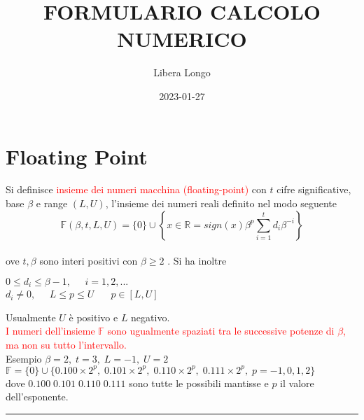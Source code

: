 \documentclass{article}
\title{FORMULARIO CALCOLO NUMERICO}
\date{2023-01-27}
\author{Libera Longo}
\newcommand\separationline{\noindent\rule{\textwidth}{0.4pt}} %
\begin{document}
	\maketitle
	\section{Floating Point}

		Si definisce \textcolor{red}{insieme dei numeri macchina (floating-point)} con $t$ cifre significative,
		base $\beta$ e range $( L, U )$, l'insieme dei numeri reali definito nel modo seguente
		\[
			\mathbb{F} ( \beta , t, L, U ) = \{ 0  \} \cup \left \{ x \in \mathbb{R} = sign(x) \beta^p \sum_{i=1}^{t} d_{i} \beta^{-i} \right \}
		\] \\
		ove $t, \beta$ sono interi positivi con {\color{blue} $ \beta \geq 2 $ }.
		Si ha inoltre
		\begin{center}
			{\color{blue} $ 0 \leq d_i \leq \beta -1, \;\;\;\;\; i = 1, 2,... $} \\
			{\color{blue} $ d_i \neq 0, \;\;\;\;\; L \leq p \leq U $ } $ \;\;\;\;\; p \in \left [ L, U \right ] $
		\end{center}
		Usualmente $U$ è positivo e $L$ negativo. \\
		\textcolor{red}{I numeri dell'insieme $\mathbb{F}$ sono ugualmente spaziati tra le successive potenze di $\beta$, ma non su tutto l'intervallo.} \\
		Esempio
		$\beta = 2, \; t = 3, \; L = -1, \; U = 2 $ \\
		$\mathbb{F} = \{ 0 \} \cup \{ 0.100 \times 2^p, \; 0.101 \times 2^p, \; 0.110 \times 2^p, \; 0.111 \times 2^p , \; p = -1, 0, 1, 2 \} $ \\
		dove $0.100 \; 0.101 \; 0.110 \; 0.111$ sono tutte le possibili mantisse e $p$ il valore dell'esponente.

		\separationline
\end{document}
